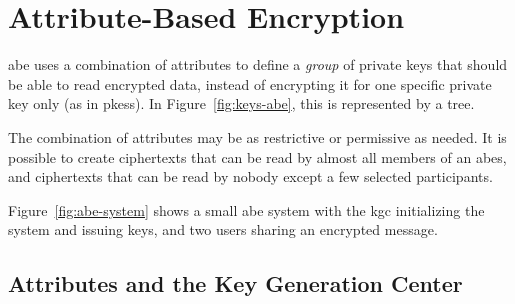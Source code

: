 \section{Attribute-Based Encryption}
\acrfull{abe} uses a combination of attributes to define a \emph{group} of private keys that should be able to read encrypted data, instead of encrypting it for one specific private key only (as in \glspl{pkes}).
In Figure~\ref{fig:keys-abe}, this is represented by a tree.

The combination of attributes may be as restrictive or permissive as needed.
It is possible to create ciphertexts that can be read by almost all members of an \acrshort{abes}, and ciphertexts that can be read by nobody except a few selected participants.

Figure~\ref{fig:abe-system} shows a small \acrshort{abe} system with the \acrshort{kgc} initializing the system and issuing keys, and two users sharing an encrypted message.
\subsection{Attributes and the Key Generation Center}

